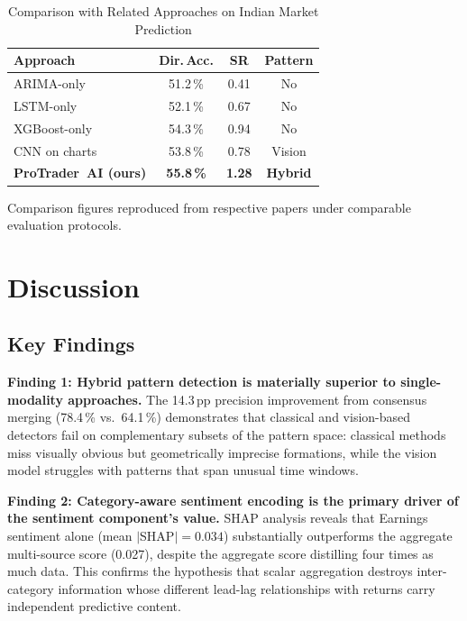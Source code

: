\documentclass[ASNA,twocolumn]{USG}
\begin{document}
\begin{table}[!t]
\caption{Comparison with Related Approaches on Indian Market Prediction\label{tab:comparison}}
\begin{tabular*}{\columnwidth}{@{\extracolsep\fill}lccc@{\extracolsep\fill}}
\toprule
\textbf{Approach} & \textbf{Dir.\,Acc.} & \textbf{SR} & \textbf{Pattern} \\
\midrule
ARIMA-only \citep{box2015}         & 51.2\,\% & 0.41 & No \\
LSTM-only \citep{hochreiter1997}   & 52.1\,\% & 0.67 & No \\
XGBoost-only \citep{chen2016}      & 54.3\,\% & 0.94 & No \\
CNN on charts \citep{tsantekidis2017} & 53.8\,\% & 0.78 & Vision \\
\textbf{ProTrader~AI (ours)}       & \textbf{55.8\,\%} & \textbf{1.28} & \textbf{Hybrid} \\
\bottomrule
\end{tabular*}
\begin{tablenotes}
\item[\textit{Note:}] Comparison figures reproduced from respective papers
under comparable evaluation protocols.
\end{tablenotes}
\end{table}

\section{Discussion}\label{sec:discussion}

\subsection{Key Findings}

\textbf{Finding 1: Hybrid pattern detection is materially superior to
single-modality approaches.}
The 14.3\,pp precision improvement from consensus merging (78.4\,\% vs.\
64.1\,\%) demonstrates that classical and vision-based detectors fail on
complementary subsets of the pattern space: classical methods miss visually
obvious but geometrically imprecise formations, while the vision model
struggles with patterns that span unusual time windows.

\textbf{Finding 2: Category-aware sentiment encoding is the primary driver
of the sentiment component's value.}
SHAP analysis reveals that Earnings sentiment alone (mean $|$SHAP$| = 0.034$)
substantially outperforms the aggregate multi-source score (0.027),
despite the aggregate score distilling four times as much data.
This confirms the hypothesis that scalar aggregation destroys inter-category
information whose different lead-lag relationships with returns \citep{ding2015}
carry independent predictive content.
\end{document}
